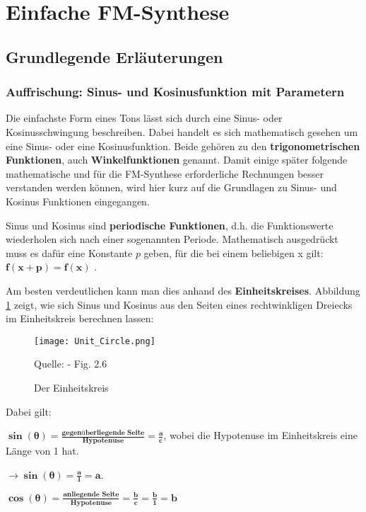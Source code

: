 \section{Einfache FM-Synthese}

\FloatBarrier
\subsection{Grundlegende Erläuterungen}
\subsubsection{Auffrischung: Sinus- und Kosinusfunktion mit Parametern}
Die einfachste Form eines Tons lässt sich durch eine Sinus- oder Kosinusschwingung beschreiben. Dabei handelt es sich mathematisch gesehen um eine Sinus- oder eine Kosinusfunktion. Beide gehören zu den \textbf{trigonometrischen Funktionen}, auch \textbf{Winkelfunktionen} genannt. Damit einige später folgende mathematische und für die FM-Synthese erforderliche Rechnungen besser verstanden werden können, wird hier kurz auf die Grundlagen zu Sinus- und Kosinus Funktionen eingegangen. 

Sinus und Kosinus sind \textbf{periodische Funktionen}, d.h. die Funktionswerte wiederholen sich nach einer sogenannten Periode. Mathematisch ausgedrückt muss es dafür eine Konstante $p$  geben, für die bei einem beliebigen x gilt: $\bm{f(x + p) =  f(x)}$ .

Am besten verdeutlichen kann man dies anhand des \textbf{Einheitskreises}. Abbildung \ref{fig:unitcircle} zeigt, wie sich Sinus und Kosinus aus den Seiten eines rechtwinkligen Dreiecks im Einheitskreis berechnen lassen:

\begin{figure} [ht]
\centering
\texttt{[image: Unit\_Circle.png]}
\caption{Der Einheitskreis}
\label{fig:unitcircle}
Quelle: \cite{fmtheory} - Fig. 2.6
\end{figure}

Dabei gilt: 

$\bm{\sin(\theta) = \frac{\textbf{gegenüberliegende Seite}}{\textbf{Hypotenuse}} = \frac{a}{c}}$, wobei die Hypotenuse im Einheitskreis eine Länge von 1 hat. 

$\bm{\to\sin(\theta) = \frac{a}{1} = a}$.

$\bm{\cos(\theta) = \frac{\textbf{anliegende Seite}}{\textbf{Hypotenuse}} = \frac{b}{c} = \frac{b}{1} = b}$ \cite[s. 22 - 27]{fmtheory} \\

